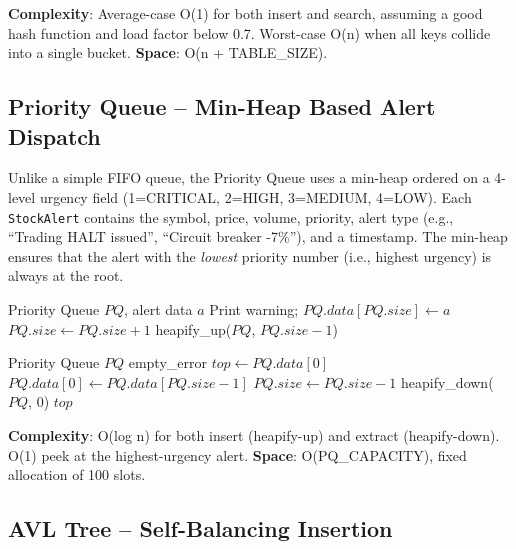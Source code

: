 \documentclass[conference]{IEEEtran}
\begin{document}
\textbf{Complexity}: Average-case O(1) for both insert and search, assuming a good hash function and load factor below 0.7. Worst-case O(n) when all keys collide into a single bucket. \textbf{Space}: O(n + TABLE\_SIZE).

\subsection{Priority Queue -- Min-Heap Based Alert Dispatch}

Unlike a simple FIFO queue, the Priority Queue uses a min-heap ordered on a 4-level urgency field (1=CRITICAL, 2=HIGH, 3=MEDIUM, 4=LOW). Each \texttt{StockAlert} contains the symbol, price, volume, priority, alert type (e.g., ``Trading HALT issued'', ``Circuit breaker -7\%''), and a timestamp. The min-heap ensures that the alert with the \emph{lowest} priority number (i.e., highest urgency) is always at the root.

\begin{algorithm}
\caption{Priority Queue Insert (\texttt{pq\_insert})}
\begin{algorithmic}[1]
\REQUIRE Priority Queue $PQ$, alert data $a$
  \STATE Print warning; \RETURN {}
\ENDIF
\STATE $PQ.data[PQ.size] \gets a$
\STATE $PQ.size \gets PQ.size + 1$
\STATE heapify\_up($PQ$, $PQ.size - 1$)
\end{algorithmic}
\end{algorithm}

\begin{algorithm}
\caption{Priority Queue Extract (\texttt{pq\_extract})}
\begin{algorithmic}[1]
\REQUIRE Priority Queue $PQ$
  \RETURN empty\_error
\ENDIF
\STATE $top \gets PQ.data[0]$ 
\STATE $PQ.data[0] \gets PQ.data[PQ.size - 1]$
\STATE $PQ.size \gets PQ.size - 1$
  \STATE heapify\_down($PQ$, $0$)
\ENDIF
\RETURN $top$
\end{algorithmic}
\end{algorithm}

\textbf{Complexity}: O(log n) for both insert (heapify-up) and extract (heapify-down). O(1) peek at the highest-urgency alert. \textbf{Space}: O(PQ\_CAPACITY), fixed allocation of 100 slots.

\subsection{AVL Tree -- Self-Balancing Insertion}
\end{document}
